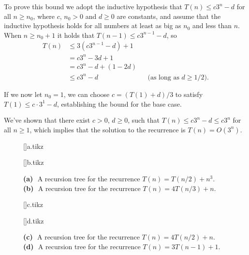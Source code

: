 To prove this bound we adopt the inductive hypothesis that $T(n)\le c3^n-d$ for all $n\ge n_0$, where $c$, $n_0>0$ and $d\ge0$ are constants, and assume that the inductive hypothesis holds for all numbers at least as big as $n_0$ and less than $n$.
When $n\ge n_0+1$ it holds that $T(n-1)\le c3^{n-1}-d$, so
\begin{align*}
    T(n) &\le 3(c3^{n-1}-d)+1 \\
    &= c3^n-3d+1 \\
    &= c3^n-d+(1-2d) \\
    &\le c3^n-d && \text{(as long as $d\ge1/2$)}.
\end{align*}

If we now let $n_0=1$, we can choose $c=(T(1)+d)/3$ to satisfy $T(1)\le c\cdot3^1-d$, establishing the bound for the base case.

We've shown that there exist $c>0$, $d\ge0$, such that $T(n)\le c3^n-d\le c3^n$ for all $n\ge1$, which implies that the solution to the recurrence is $T(n)=O(3^n)$.

\begin{figure}[!htb]
    \subcaptionbox{\label{fig:4.4-1a}}[\textwidth]{{a.tikz}}
    \par\vspace{10mm}
    \subcaptionbox{\label{fig:4.4-1b}}[\textwidth]{{b.tikz}}
    \caption{
        \textbf{(a)}\,~A recursion tree for the recurrence $T(n)=T(n/2)+n^3$.\,
        \textbf{(b)}\,~A recursion tree for the recurrence $T(n)=4T(n/3)+n$.
    } \label{fig:4.4-1}
\end{figure}

\begin{figure}[htb!]\ContinuedFloat
    \subcaptionbox{\label{fig:4.4-1c}}[\textwidth]{{c.tikz}}
    \par\vspace{10mm}
    \subcaptionbox{\label{fig:4.4-1d}}[\textwidth]{{d.tikz}}
    \caption{
        \textbf{(c)}\,~A recursion tree for the recurrence $T(n)=4T(n/2)+n$.\,
        \textbf{(d)}\,~A recursion tree for the recurrence $T(n)=3T(n-1)+1$.
    }
\end{figure}
